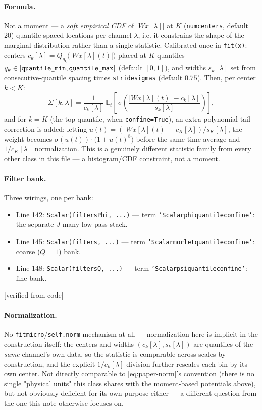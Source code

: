 \documentclass[11pt]{article}
\newcommand{\E}{\mathbb{E}}
\newcommand{\Wx}{W\!x}
\newcommand{\code}[1]{\texttt{#1}}
\renewcommand{\_}{\origunderscore\allowbreak} %
\newcommand{\verified}{\textcolor{blue!50!black}{[verified from code]}}
\begin{document}
\paragraph{Formula.} Not a moment — a \emph{soft empirical CDF} of $|\Wx[\lambda]|$
at $K$ (\code{num\_centers}, default 20) quantile-spaced locations per channel
$\lambda$, i.e. it constrains the shape of the marginal distribution rather than
a single statistic. Calibrated once in \code{fit(x)}: centers
$c_k[\lambda] = Q_{q_k}\big(|\Wx[\lambda](t)|\big)$ placed at $K$ quantiles
$q_k \in [\code{quantile\_min},\code{quantile\_max}]$ (default $[0,1]$), and
widths $s_k[\lambda]$ set from consecutive-quantile spacing times
\code{stride\_sigmas} (default $0.75$). Then, per center $k<K$:
\begin{equation}
  \Sigma[k,\lambda] = \frac{1}{c_k[\lambda]}\;\E_t\left[\,\sigma\!\left(\frac{|\Wx[\lambda](t)| - c_k[\lambda]}{s_k[\lambda]}\right)\right],
\end{equation}
and for $k=K$ (the top quantile, when \code{confine=True}), an extra
polynomial tail correction is added: letting $u(t)=(|\Wx[\lambda](t)|-c_K[\lambda])/s_K[\lambda]$,
the weight becomes $\sigma(u(t))\cdot\big(1+u(t)^8\big)$ before the same
time-average and $1/c_K[\lambda]$ normalization. This is a genuinely different
statistic family from every other class in this file — a histogram/CDF
constraint, not a moment.

\paragraph{Filter bank.} Three wirings, one per bank:
\begin{itemize}
  \item Line 142: \code{Scalar(filters\_Phi, ...)} — term \code{'Scalar\_phi\_quantile\_confine'}: the separate $J$-many low-pass stack.
  \item Line 145: \code{Scalar(filters, ...)} — term \code{'Scalar\_morlet\_quantile\_confine'}: coarse ($Q=1$) bank.
  \item Line 148: \code{Scalar(filters\_Q, ...)} — term \code{'Scalar\_psi\_quantile\_confine'}: fine bank.
\end{itemize}
\verified

\paragraph{Normalization.} No \code{fit\_micro}/\code{self.norm} mechanism at
all — normalization here is implicit in the construction itself: the centers
and widths $(c_k[\lambda], s_k[\lambda])$ are quantiles of the \emph{same}
channel's own data, so the statistic is comparable across scales by
construction, and the explicit $1/c_k[\lambda]$ division further rescales each
bin by its own center. Not directly comparable to \eqref{eq:paper-norm}'s
convention (there is no single "physical units" this class shares with the
moment-based potentials above), but not obviously deficient for its own purpose
either — a different question from the one this note otherwise focuses on.
\end{document}
